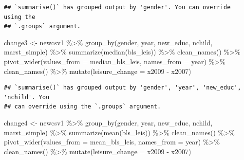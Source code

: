 \documentclass[
]{article}
\newenvironment{Shaded}{\begin{snugshade}}{\end{snugshade}}
\newcommand{\AttributeTok}[1]{\textcolor[rgb]{0.77,0.63,0.00}{#1}}
\newcommand{\FunctionTok}[1]{\textcolor[rgb]{0.00,0.00,0.00}{#1}}
\newcommand{\NormalTok}[1]{#1}
\newcommand{\OtherTok}[1]{\textcolor[rgb]{0.56,0.35,0.01}{#1}}
\newcommand{\SpecialCharTok}[1]{\textcolor[rgb]{0.00,0.00,0.00}{#1}}
\begin{document}
\begin{verbatim}
## `summarise()` has grouped output by 'gender'. You can override using the
## `.groups` argument.
\end{verbatim}

\begin{Shaded}
\begin{Highlighting}[]
\NormalTok{change3 }\OtherTok{\textless{}{-}}\NormalTok{ newcsv1 }\SpecialCharTok{\%\textgreater{}\%}
  \FunctionTok{group\_by}\NormalTok{(gender,  year, new\_educ, nchild, marst\_simple) }\SpecialCharTok{\%\textgreater{}\%}
  \FunctionTok{summarize}\NormalTok{(}\FunctionTok{median}\NormalTok{(bls\_leis)) }\SpecialCharTok{\%\textgreater{}\%}
  \FunctionTok{clean\_names}\NormalTok{() }\SpecialCharTok{\%\textgreater{}\%}
  \FunctionTok{pivot\_wider}\NormalTok{(}\AttributeTok{values\_from =}\NormalTok{ median\_bls\_leis, }\AttributeTok{names\_from =}\NormalTok{ year) }\SpecialCharTok{\%\textgreater{}\%}
  \FunctionTok{clean\_names}\NormalTok{() }\SpecialCharTok{\%\textgreater{}\%}
  \FunctionTok{mutate}\NormalTok{(}\AttributeTok{leisure\_change =}\NormalTok{ x2009 }\SpecialCharTok{{-}}\NormalTok{ x2007)}
\end{Highlighting}
\end{Shaded}

\begin{verbatim}
## `summarise()` has grouped output by 'gender', 'year', 'new_educ', 'nchild'. You
## can override using the `.groups` argument.
\end{verbatim}

\begin{Shaded}
\begin{Highlighting}[]
\NormalTok{change4 }\OtherTok{\textless{}{-}}\NormalTok{ newcsv1 }\SpecialCharTok{\%\textgreater{}\%}
  \FunctionTok{group\_by}\NormalTok{(gender,  year, new\_educ, nchild, marst\_simple) }\SpecialCharTok{\%\textgreater{}\%}
  \FunctionTok{summarize}\NormalTok{(}\FunctionTok{mean}\NormalTok{(bls\_leis)) }\SpecialCharTok{\%\textgreater{}\%}
  \FunctionTok{clean\_names}\NormalTok{() }\SpecialCharTok{\%\textgreater{}\%}
  \FunctionTok{pivot\_wider}\NormalTok{(}\AttributeTok{values\_from =}\NormalTok{ mean\_bls\_leis, }\AttributeTok{names\_from =}\NormalTok{ year) }\SpecialCharTok{\%\textgreater{}\%}
  \FunctionTok{clean\_names}\NormalTok{() }\SpecialCharTok{\%\textgreater{}\%}
  \FunctionTok{mutate}\NormalTok{(}\AttributeTok{leisure\_change =}\NormalTok{ x2009 }\SpecialCharTok{{-}}\NormalTok{ x2007)}
\end{Highlighting}
\end{Shaded}
\end{document}
